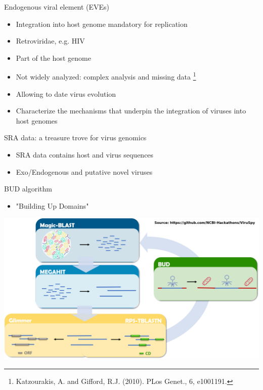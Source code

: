 \documentclass{beamer}
\begin{document}
  \begin{frame}{Endogenous viral element (EVEs)}
      \center
        
      \begin{itemize}
        \item Integration into host genome mandatory for replication
        \item Retroviridae, e.g. HIV
        \item Part of the host genome
        \item Not widely analyzed: complex analysis and missing data
              \footnote{Katzourakis, A. and Gifford, R.J. (2010). PLos Genet., 6, e1001191.}
        \item Allowing to date virus evolution
        \item Characterize the mechanisms that underpin the integration of
              viruses into host genomes
      \end{itemize}
  \end{frame}

  \begin{frame}{SRA data: a treasure trove for virus genomics}
    \begin{itemize}
      \item SRA data contains host and virus sequences
      \item Exo/Endogenous and putative novel viruses
    \end{itemize}
    
  \end{frame}


  \begin{frame}{BUD algorithm}
    \begin{itemize}
      \item "Building Up Domains"
    \end{itemize}
    \center
    \includegraphics[width=\linewidth]{figs/bud_algo.jpg}
  \end{frame}
\end{document}
